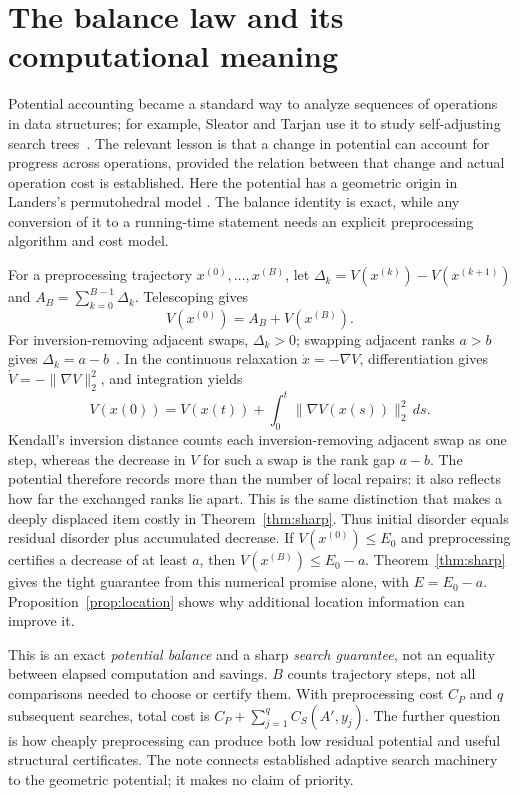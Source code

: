 \documentclass[10pt,letterpaper]{article}
\begin{document}
\section{The balance law and its computational meaning}
Potential accounting became a standard way to analyze sequences of operations
in data structures; for example, Sleator and Tarjan use it to study
self-adjusting search trees~\cite{sleator}. The relevant lesson is that a
change in potential can account for progress across operations, provided the
relation between that change and actual operation cost is established. Here
the potential has a geometric origin in Landers's permutohedral model
\cite{landers}. The balance identity is exact, while any conversion of it to
a running-time statement needs an explicit preprocessing algorithm and cost
model.

For a preprocessing trajectory $x^{(0)},\ldots,x^{(B)}$, let
$\Delta_k=V(x^{(k)})-V(x^{(k+1)})$ and $A_B=\sum_{k=0}^{B-1}\Delta_k$. Telescoping gives
\begin{equation}
 \boxed{V(x^{(0)})=A_B+V(x^{(B)}).} \label{eq:balance}
\end{equation}
For inversion-removing adjacent swaps, $\Delta_k>0$; swapping adjacent ranks $a>b$
gives $\Delta_k=a-b$~\cite{landers}. In the continuous relaxation
$\dot x=-\nabla V$, differentiation gives $\dot V=-\|\nabla V\|_2^2$, and integration yields
\begin{equation}
 V(x(0))=V(x(t))+\int_0^t\|\nabla V(x(s))\|_2^2\,ds.
 \label{eq:flow}
\end{equation}
Kendall's inversion distance counts each inversion-removing adjacent swap as
one step, whereas the decrease in $V$ for such a swap is the rank gap $a-b$.
The potential therefore records more than the number of local repairs: it
also reflects how far the exchanged ranks lie apart. This is the same
distinction that makes a deeply displaced item costly in
Theorem~\ref{thm:sharp}.
Thus initial disorder equals residual disorder plus accumulated decrease. If
$V(x^{(0)})\leq E_0$ and preprocessing certifies a decrease of at least $a$, then
$V(x^{(B)})\leq E_0-a$. Theorem~\ref{thm:sharp} gives the tight guarantee from
this numerical promise alone, with $E=E_0-a$. Proposition~\ref{prop:location} shows
why additional location information can improve it.

This is an exact \emph{potential balance} and a sharp \emph{search guarantee}, not an
equality between elapsed computation and savings. $B$ counts trajectory steps, not
all comparisons needed to choose or certify them. With preprocessing cost $C_P$ and
$q$ subsequent searches, total cost is $C_P+\sum_{j=1}^q C_S(A',y_j)$.
The further question is how cheaply preprocessing can produce both low residual
potential and useful structural certificates. The note connects established adaptive
search machinery~\cite{disser} to the geometric potential; it makes no claim of priority.
\end{document}
